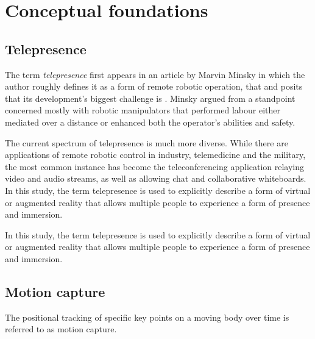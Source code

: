 \chapter{Conceptual foundations}
\label{chapter:conceptualFoundations}

\section{Telepresence}

The term \emph{telepresence} first appears in an article by Marvin Minsky in which the author roughly defines it as a form of remote robotic operation, that  and posits that its development's biggest challenge is  \parencite{minskyTelepresence}. Minsky argued from a standpoint concerned mostly with robotic manipulators that performed labour either mediated over a distance or enhanced both the operator's abilities and safety.

The current spectrum of telepresence is much more diverse. While there are applications of remote robotic control in industry, telemedicine and the military, the most common instance has become the teleconferencing application relaying video and audio streams, as well as allowing chat and collaborative whiteboards. In this study, the term telepresence is used to explicitly describe a form of virtual or augmented reality that allows multiple people to experience a form of presence and immersion.

In this study, the term telepresence is used to explicitly describe a form of virtual or augmented reality that allows multiple people to experience a form of presence and immersion.

\section{Motion capture}

The positional tracking of specific key points on a moving body over time is referred to as motion capture.

